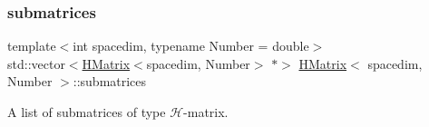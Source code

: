 \mbox{\label{classHMatrix_a4bd1b9a32f2c7693e603a7c6ea916e4f}} 
\subsubsection{\texorpdfstring{submatrices}{submatrices}}
{\footnotesize\ttfamily template$<$int spacedim, typename Number = double$>$ \\
std\+::vector$<$\hyperlink{classHMatrix}{H\+Matrix}$<$spacedim, Number$>$ $\ast$$>$ \hyperlink{classHMatrix}{H\+Matrix}$<$ spacedim, Number $>$\+::submatrices\hspace{0.3cm}{\ttfamily [private]}}

A list of submatrices of type $\mathcal{H}$-\/matrix. 

